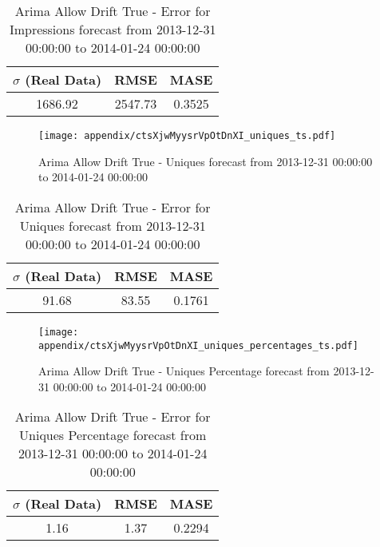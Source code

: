 \begin{table}[H]
\centering
\footnotesize
\begin{tabular}{ccc}
$\sigma$ (Real Data) & RMSE & MASE   \\ \hline
1686.92 & 2547.73 & 0.3525 \\
\end{tabular}

\vspace{0.5cm}

\caption{
Arima Allow Drift True - Error for Impressions forecast from 2013-12-31 00:00:00 to 2014-01-24 00:00:00}
\end{table}

\begin{figure}[H] \begin{center} \leavevmode
\texttt{[image: appendix/ctsXjwMyysrVpOtDnXI\_uniques\_ts.pdf]} \caption{
Arima Allow Drift True - Uniques forecast from 2013-12-31 00:00:00 to 2014-01-24 00:00:00} \label{fig:appendix/ctsXjwMyysrVpOtDnXI_uniques_ts.pdf} \end{center}
\end{figure}

\begin{table}[H]
\centering
\footnotesize
\begin{tabular}{ccc}
$\sigma$ (Real Data) & RMSE & MASE   \\ \hline
91.68 & 83.55 & 0.1761 \\
\end{tabular}

\vspace{0.5cm}

\caption{
Arima Allow Drift True - Error for Uniques forecast from 2013-12-31 00:00:00 to 2014-01-24 00:00:00}
\end{table}

\begin{figure}[H] \begin{center} \leavevmode
\texttt{[image: appendix/ctsXjwMyysrVpOtDnXI\_uniques\_percentages\_ts.pdf]} \caption{
Arima Allow Drift True - Uniques Percentage forecast from 2013-12-31 00:00:00 to 2014-01-24 00:00:00} \label{fig:appendix/ctsXjwMyysrVpOtDnXI_uniques_percentages_ts.pdf} \end{center}
\end{figure}

\begin{table}[H]
\centering
\footnotesize
\begin{tabular}{ccc}
$\sigma$ (Real Data) & RMSE & MASE   \\ \hline
1.16 & 1.37 & 0.2294 \\
\end{tabular}

\vspace{0.5cm}

\caption{
Arima Allow Drift True - Error for Uniques Percentage forecast from 2013-12-31 00:00:00 to 2014-01-24 00:00:00}
\end{table}

